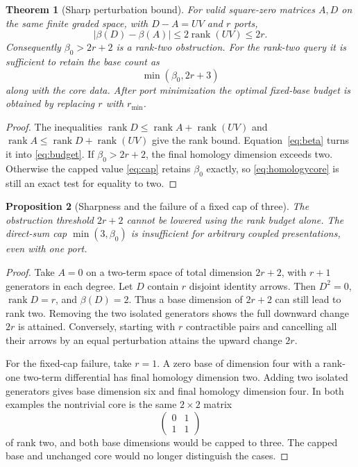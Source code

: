 \documentclass[11pt,letterpaper]{article}
\newcommand{\rk}{\operatorname{rank}}
\newtheorem{theorem}{Theorem}[section]
\newtheorem{proposition}[theorem]{Proposition}
\theoremstyle{definition}
\theoremstyle{remark}
\numberwithin{equation}{section}
\begin{document}
\begin{theorem}[Sharp perturbation bound]
\label{thm:budget}
For valid square-zero matrices $A,D$ on the same finite graded space,
with $D-A=UV$ and $r$ ports,
\begin{equation}
 |\beta(D)-\beta(A)|\le2\rk(UV)\le2r.
 \label{eq:budget}
\end{equation}
Consequently $\beta_0>2r+2$ is a rank-two obstruction. For the rank-two
query it is sufficient to retain the base count as
\begin{equation}
 \min(\beta_0,2r+3)
 \label{eq:cap}
\end{equation}
along with the core data. After port minimization the optimal fixed-base
budget is obtained by replacing $r$ with $r_{\min}$.
\end{theorem}
\begin{proof}
The inequalities
$\rk D\le\rk A+\rk(UV)$ and
$\rk A\le\rk D+\rk(UV)$ give the rank bound. Equation~\eqref{eq:beta}
turns it into \eqref{eq:budget}. If $\beta_0>2r+2$, the final homology
dimension exceeds two. Otherwise the capped value \eqref{eq:cap} retains
$\beta_0$ exactly, so \eqref{eq:homologycore} is still an exact test for
equality to two.
\end{proof}

\begin{proposition}[Sharpness and the failure of a fixed cap of three]
\label{prop:capsharp}
The obstruction threshold $2r+2$ cannot be lowered using the rank budget
alone. The direct-sum cap $\min(3,\beta_0)$ is insufficient for arbitrary
coupled presentations, even with one port.
\end{proposition}
\begin{proof}
Take $A=0$ on a two-term space of total dimension $2r+2$, with $r+1$
generators in each degree. Let $D$ contain $r$ disjoint identity arrows.
Then $D^2=0$, $\rk D=r$, and $\beta(D)=2$. Thus a base dimension of
$2r+2$ can still lead to rank two. Removing the two isolated generators
shows the full downward change $2r$ is attained. Conversely, starting
with $r$ contractible pairs and cancelling all their arrows by an equal
perturbation attains the upward change $2r$.

For the fixed-cap failure, take $r=1$. A zero base of dimension four
with a rank-one two-term differential has final homology dimension two.
Adding two isolated generators gives base dimension six and final
homology dimension four. In both examples the nontrivial core is the
same $2\times2$ matrix
\[
 \begin{pmatrix}0&1\\1&1\end{pmatrix}
\]
of rank two, and both base dimensions would be capped to three. The
capped base and unchanged core would no longer distinguish the cases.
\end{proof}
\end{document}
